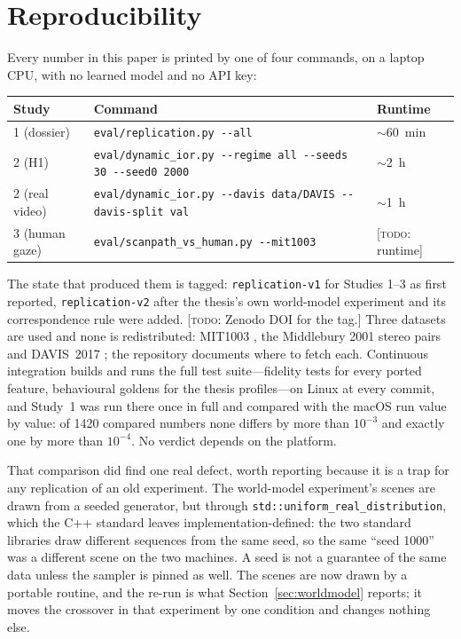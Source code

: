 \documentclass[11pt,a4paper]{article}
\newcommand{\todo}[1]{\textcolor{red!70!black}{[\textsc{todo:} #1]}}
\newcommand{\todo}[1]{}
\begin{document}
\section{Reproducibility}
\label{sec:repro}
Every number in this paper is printed by one of four commands, on a laptop CPU,
with no learned model and no API key:
\begin{center}\small
\begin{tabular}{@{}lll@{}}
\toprule
Study & Command & Runtime \\
\midrule
1 (dossier) & \texttt{eval/replication.py -{}-all} & $\sim$60~min \\
2 (H1) & \texttt{eval/dynamic\_ior.py -{}-regime all -{}-seeds 30 -{}-seed0 2000} & $\sim$2~h \\
2 (real video) & \texttt{eval/dynamic\_ior.py -{}-davis data/DAVIS -{}-davis-split val} & $\sim$1~h \\
3 (human gaze) & \texttt{eval/scanpath\_vs\_human.py -{}-mit1003} & \todo{runtime} \\
\bottomrule
\end{tabular}
\end{center}
The state that produced them is tagged: \texttt{replication-v1} for Studies 1--3
as first reported, \texttt{replication-v2} after the thesis's own world-model
experiment and its correspondence rule were added. \todo{Zenodo DOI for the
tag.} Three datasets are used and none is redistributed: MIT1003
\citep{judd2009}, the Middlebury 2001 stereo pairs \citep{scharstein2002} and
DAVIS~2017 \citep{ponttuset2017}; the repository documents where to fetch each.
Continuous integration builds and runs the full test suite---fidelity tests for
every ported feature, behavioural goldens for the thesis profiles---on Linux at
every commit, and Study~1 was run there once in full and compared with the
macOS run value by value: of 1420 compared numbers none differs by more than
$10^{-3}$ and exactly one by more than $10^{-4}$. No verdict depends on the
platform.

That comparison did find one real defect, worth reporting because it is a trap
for any replication of an old experiment. The world-model experiment's scenes
are drawn from a seeded generator, but through
\texttt{std::uniform\_real\_distribution}, which the C++ standard leaves
implementation-defined: the two standard libraries draw different sequences from
the same seed, so the same ``seed 1000'' was a different scene on the two
machines. A seed is not a guarantee of the same data unless the sampler is
pinned as well. The scenes are now drawn by a portable routine, and the re-run
is what Section~\ref{sec:worldmodel} reports; it moves the crossover in that
experiment by one condition and changes nothing else.
\end{document}
